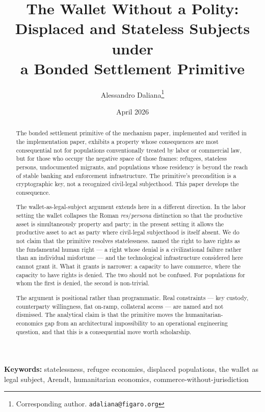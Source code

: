 \documentclass[11pt,a4paper]{article}
\title{%
  The Wallet Without a Polity:\\
  Displaced and Stateless Subjects under\\
  a Bonded Settlement Primitive%
}
\author{
  Alessandro Daliana\thanks{Corresponding author. \texttt{adaliana@figaro.org}}
}
\date{April 2026}
\theoremstyle{remark}
\begin{document}
\maketitle

\begin{abstract}
The bonded settlement primitive of the mechanism paper,
implemented and verified in the implementation paper, exhibits a
property whose consequences are most consequential not for
populations conventionally treated by labor or commercial law, but
for those who occupy the negative space of those frames: refugees,
stateless persons, undocumented migrants, and populations whose
residency is beyond the reach of stable banking and enforcement
infrastructure. The primitive's precondition is a cryptographic
key, not a recognized civil-legal subjecthood. This paper
develops the consequence.

The wallet-as-legal-subject argument extends here in a different
direction. In the labor setting the wallet collapses the Roman
\emph{res}/\emph{persona} distinction so that the productive asset
is simultaneously property and party; in the present setting it
allows the productive asset to act as party where civil-legal
subjecthood is itself absent. We do not claim that the primitive
resolves statelessness. \citet{arendt1951origins} named the right
to have rights as the fundamental human right --- a right whose
denial is a civilizational failure rather than an individual
misfortune --- and the technological infrastructure considered
here cannot grant it. What it grants is narrower: a capacity to
have commerce, where the capacity to have rights is denied. The
two should not be confused. For populations for whom the first is
denied, the second is non-trivial.

The argument is positional rather than programmatic. Real
constraints --- key custody, counterparty willingness, fiat
on-ramp, collateral access --- are named and not dismissed. The
analytical claim is that the primitive moves the
humanitarian-economics gap from an architectural impossibility to
an operational engineering question, and that this is a
consequential move worth scholarship.
\end{abstract}

\medskip
\noindent\textbf{Keywords:}
statelessness, refugee economies, displaced populations, the
wallet as legal subject, Arendt, humanitarian economics,
commerce-without-jurisdiction

\end{document}
